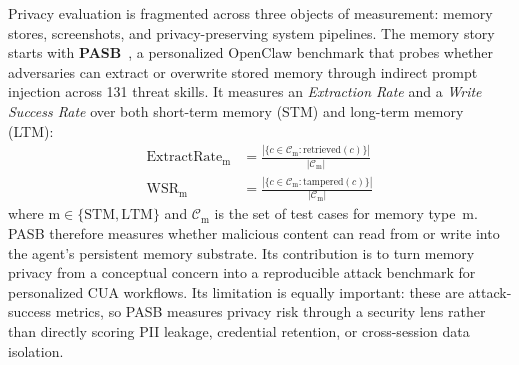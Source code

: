 Privacy evaluation is fragmented across three objects of measurement: memory stores, screenshots, and privacy-preserving system pipelines. The memory story starts with \textbf{PASB}~\cite{doubleagent2026}, a personalized OpenClaw benchmark that probes whether adversaries can extract or overwrite stored memory through indirect prompt injection across 131 threat skills. It measures an \emph{Extraction Rate} and a \emph{Write Success Rate} over both short-term memory (STM) and long-term memory (LTM):
\begin{align}
\mathrm{ExtractRate}_{\mathrm{m}} &= \frac{|\{c \in \mathcal{C}_{\mathrm{m}} : \mathrm{retrieved}(c)\}|}{|\mathcal{C}_{\mathrm{m}}|} \label{eq:extractrate} \\
\mathrm{WSR}_{\mathrm{m}} &= \frac{|\{c \in \mathcal{C}_{\mathrm{m}} : \mathrm{tampered}(c)\}|}{|\mathcal{C}_{\mathrm{m}}|} \label{eq:pasb-mem}
\end{align}
where $\mathrm{m} \in \{\mathrm{STM}, \mathrm{LTM}\}$ and $\mathcal{C}_{\mathrm{m}}$ is the set of test cases for memory type~$\mathrm{m}$. PASB therefore measures whether malicious content can read from or write into the agent's persistent memory substrate. Its contribution is to turn memory privacy from a conceptual concern into a reproducible attack benchmark for personalized CUA workflows. Its limitation is equally important: these are attack-success metrics, so PASB measures privacy risk through a security lens rather than directly scoring PII leakage, credential retention, or cross-session data isolation.

